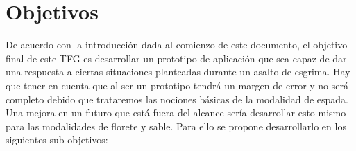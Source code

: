 \documentclass[11pt,a4paper,twoside,final]{article}
\begin{document}



\newpage

\section{Objetivos}







\iffalse





De acuerdo con la introducción dada al comienzo de este documento, el objetivo final de este
TFG es desarrollar un prototipo de aplicación que sea capaz de dar una respuesta a ciertas situaciones
planteadas durante un asalto de esgrima. Hay que tener en cuenta que al ser un prototipo tendrá un margen
de error y no será completo debido que trataremos las nociones básicas de la modalidad de espada.
 Una mejora en un futuro que está fuera del alcance sería desarrollar esto mismo para las modalidades
 de florete y sable. Para ello se propone desarrollarlo en los siguientes sub-objetivos:
\end{document}
